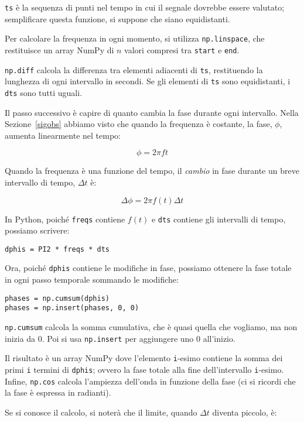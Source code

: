 \documentclass[12pt,a4paper]{book}
\begin{document}
{\tt ts} è la sequenza di punti nel tempo in cui il segnale dovrebbe essere valutato; semplificare questa funzione, si suppone che siano equidistanti.

Per calcolare la frequenza in ogni momento, si utilizza {\tt np.linspace}, che restituisce un array NumPy di $n$ valori compresi tra {\tt start} e {\tt end}.

{\tt np.diff} calcola la differenza tra elementi adiacenti di {\tt ts}, restituendo la lunghezza di ogni intervallo in secondi. Se gli elementi di {\tt ts} sono equidistanti, i {\tt dts} sono tutti uguali.

Il passo successivo è capire di quanto cambia la fase durante ogni intervallo. Nella Sezione~\ref{sigobs} abbiamo visto che quando la frequenza è costante, la fase, $\phi$, aumenta linearmente nel tempo:

%
\[ \phi = 2 \pi f t \] 

%
Quando la frequenza è una funzione del tempo, il {\em cambio} in fase durante un breve intervallo di tempo, $\Delta t$ è:

%
\[ \Delta \phi = 2 \pi f(t) \Delta t \] 

%
In Python, poiché {\tt freqs} contiene $f(t)$ e {\tt dts} contiene gli intervalli di tempo, possiamo scrivere:

\begin{verbatim} 
dphis = PI2 * freqs * dts
 \end{verbatim} 

Ora, poiché {\tt dphis} contiene le modifiche in fase, possiamo ottenere la fase totale in ogni passo temporale sommando le modifiche:

\begin{verbatim} 
phases = np.cumsum(dphis)
phases = np.insert(phases, 0, 0)
 \end{verbatim} 

{\tt np.cumsum} calcola la somma cumulativa, che è quasi quella che vogliamo, ma non inizia da 0. Poi si usa {\tt np.insert} per aggiungere uno 0 all'inizio.

Il risultato è un array NumPy dove l'elemento {\tt i}-esimo contiene la somma dei primi {\tt i} termini di {\tt dphis}; ovvero la fase totale alla fine dell'intervallo {\tt i}-esimo. Infine, {\tt np.cos} calcola l'ampiezza dell'onda in funzione della fase (ci si ricordi che la fase è espressa in radianti).

Se si conosce il calcolo, si noterà che il limite, quando $\Delta t$ diventa piccolo, è:
\end{document}
